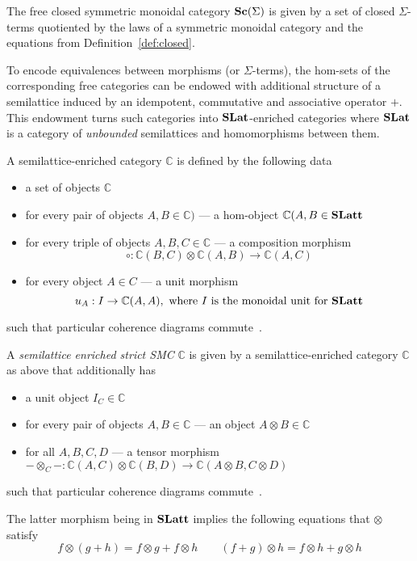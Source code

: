 \begin{definition}
The free closed symmetric monoidal category $\mathbf{Sc}(\Sigma)$ is given by a set of closed $\Sigma$-terms quotiented by the laws of a symmetric monoidal category and the equations from Definition~\ref{def:closed}.
\end{definition}

To encode equivalences between morphisms (or $\Sigma$-terms), the hom-sets of the corresponding free categories can be endowed with additional structure of a semilattice induced by an idempotent, commutative and associative operator $+$.
This endowment turns such categories into $\mathbf{SLat}$-enriched categories where $\mathbf{SLat}$ is a category of \textit{unbounded} semilattices and homomorphisms between them.

\begin{definition}
    A semilattice-enriched category $\mathbb{C}$ is defined by the following data
    \begin{itemize}
        \item a set of objects $\mathbb{C}$
        \item for every pair of objects $A,B \in \mathbb{C})$ --- a hom-object $\mathbb{C}(A,B \in \mathbf{SLatt}$
        \item for every triple of objects $A,B,C \in \mathbb{C}$ --- a composition morphism
        \[
            \circ: \mathbb{C}(B,C) \otimes \mathbb{C}(A,B) \to \mathbb{C}(A,C)
        \]
        \item for every object $A \in C$ --- a unit morphism
        \[
        u_{A} : I \to \mathbb{C}(A,A), \text{ where $I$ is the monoidal unit for $\mathbf{SLatt}$}
        \]
    \end{itemize}
    such that particular coherence diagrams commute~\cite{Borceux_1994}.
\end{definition}

\begin{definition}\label{def:enriched-prop}
    A \textit{semilattice enriched strict SMC}  $\mathbb{C}$ is given by a semilattice-enriched category $\mathbb{C}$ as above that additionally has
    \begin{itemize}
    \item a unit object $I_{C} \in \mathbb{C}$
    \item for every pair of objects $A,B \in \mathbb{C}$ --- an object $A \otimes B \in \mathbb{C}$
    \item for all $A,B,C,D$ --- a tensor morphism $ - \otimes_{C} - : \mathbb{C}(A,C) \otimes \mathbb{C}(B,D) \to \mathbb{C}(A \otimes B, C \otimes D)$
    \end{itemize}
    such that particular coherence diagrams commute~\cite{enriched_monoidal}.
    \end{definition}
    The latter morphism being in $\mathbf{SLatt}$ implies the following equations that $\otimes$ satisfy
    \[
    f \otimes (g+h) = f \otimes g + f \otimes h \qquad (f+g) \otimes h = f \otimes h + g \otimes h
    \]
    
